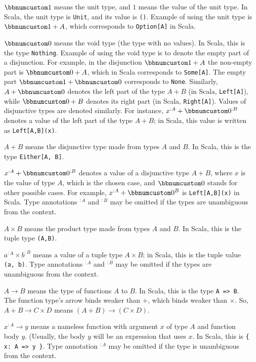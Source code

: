 $\bbnum 1$ means the unit type, and $1$ means
the value of the unit type. In Scala, the unit type is \lstinline!Unit!,
and its value is \lstinline!()!. Example of using the unit type is
$\bbnum 1+A$, which corresponds to \lstinline!Option[A]! in Scala.

$\bbnum 0$ means the void type (the type with no
values). In Scala, this is the type \lstinline!Nothing!. Example
of using the void type is to denote the empty part of a disjunction.
For example, in the disjunction $\bbnum 1+A$ the non-empty part is
$\bbnum 0+A$, which in Scala corresponds to \lstinline!Some[A]!.
The empty part $\bbnum 1+\bbnum 0$ corresponds to \lstinline!None!.
Similarly, $A+\bbnum 0$ denotes the left part of the type $A+B$
(in Scala, \lstinline!Left[A]!), while $\bbnum 0+B$ denotes its
right part (in Scala, \lstinline!Right[A]!). Values of disjunctive
types are denoted similarly. For instance, $x^{:A}+\bbnum 0^{:B}$
denotes a value of the left part of the type $A+B$; in Scala, this
value is written as \lstinline!Left[A,B](x)!.

$A+B$ means the disjunctive type made from types $A$ and $B$. In
Scala, this is the type \texttt{}\lstinline!Either[A, B]!.

$x^{:A}+\bbnum 0^{:B}$ denotes a value of a disjunctive type $A+B$,
where $x$ is the value of type $A$, which is the chosen case, and
$\bbnum 0$ stands for other possible cases. For example, $x^{:A}+\bbnum 0^{B}$
is \lstinline!Left[A,B](x)! in Scala. Type annotations $^{:A}$ and
$^{:B}$ may be omitted if the types are unambiguous from the context.

$A\times B$ means the product type made from types $A$ and $B$.
In Scala, this is the tuple type \lstinline!(A,B)!.

$a^{:A}\times b^{:B}$ means a value of a tuple type $A\times B$;
in Scala, this is the tuple value \lstinline!(a, b)!. Type annotations
$^{:A}$ and $^{:B}$ may be omitted if the types are unambiguous
from the context.

$A\rightarrow B$ means the type of functions $A$ to $B$. In Scala,
this is the type \lstinline!A => B!. The function type\textsf{'}s arrow binds
weaker than $+$, which binds weaker than $\times$. So, $A+B\rightarrow C\times D$
means $(A+B)\rightarrow(C\times D)$.

$x^{:A}\rightarrow y$ means a nameless function with argument $x$
of type $A$ and function body $y$. (Usually, the body $y$ will
be an expression that uses $x$. In Scala, this is \lstinline!{ x: A => y }!.
Type annotation $^{:A}$ may be omitted if the type is unambiguous
from the context.

